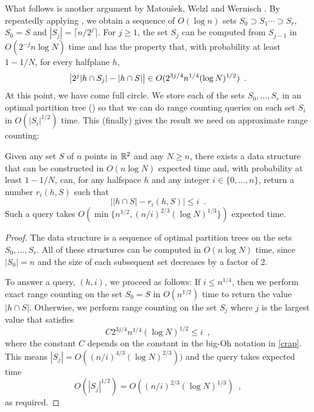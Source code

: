 \documentclass{patmorin}
\begin{document}
What follows is another argument by Matou\v{s}ek, Welzl and Wernisch
\cite[Lemma~2.2]{mww93}.  By repeatedly applying , we
obtain a sequence of $O(\log n)$ sets $S_0\supset S_1\cdots\supset S_r$,
$S_0=S$ and $|S_j|=\lceil n/2^j\rceil$.  For $j\ge 1$, the set $S_j$
can be computed from $S_{j-1}$ in $O(2^{-j}n\log N)$ time and has the
property that, with probability at least $1-1/N$, for every halfplane $h$,
\begin{equation}
   \left|2^j|h\cap S_j| - |h\cap S|\right| \in O(2^{3j/4}n^{1/4}(\log N)^{1/2}) \enspace .
  \eqlabel{crap}
\end{equation}
At this point, we have come full circle.  We store each
of the sets $S_0,\ldots,S_r$ in an optimal partition tree
() so that we can do range counting
queries on each set $S_i$ in $O(|S_i|^{1/2})$ time.  This (finally)
gives the result we need on approximate range counting:
\begin{lem}
  Given any set $S$ of $n$ points in $\mathbb{R}^2$ and any $N\ge n$, there exists
  a data structure that can be constructed in $O(n\log N)$ expected time
  and, with probability at least $1-1/N$, can, for any halfspace $h$
  and any integer $i\in\{0,\ldots,n\}$, return a number $r_i(h,S)$ such that
  \[  \left||h\cap S|-r_i(h,S)\right| \le i \enspace .\]
  Such a query takes $O(\min\{n^{1/2},(n/i)^{2/3}(\log N)^{1/3}\})$ expected time.
\end{lem}

\begin{proof}
  The data structure is a sequence of optimal partition trees on the
  sets $S_0,\ldots,S_r$.  All of these structures can be computed in
  $O(n\log N)$ time, since $|S_0|=n$ and the size of each subsequent
  set decreases by a factor of 2.

  To answer a query, $(h,i)$, we proceed as follows: If $i\le n^{1/4}$,
  then we perform exact range counting on the set $S_0=S$ in $O(n^{1/2})$
  time to return the value $|h\cap S|$.  Otherwise, we perform range
  counting on the set $S_j$ where $j$ is the largest value that satisfies
  \[
      C2^{3j/4} n^{1/4}(\log N)^{1/2} \le i \enspace ,
  \]
  where the constant $C$ depends on the constant in the big-Oh notation
  in \eqref{crap}.  This means $|S_j| = O((n/i)^{4/3}(\log N)^{2/3}))$
  and the query takes expected time
  \[
      O(|S_j|^{1/2}) = O((n/i)^{2/3}(\log N)^{1/3}) \enspace ,
  \]
   as required.
\end{proof}
\end{document}
